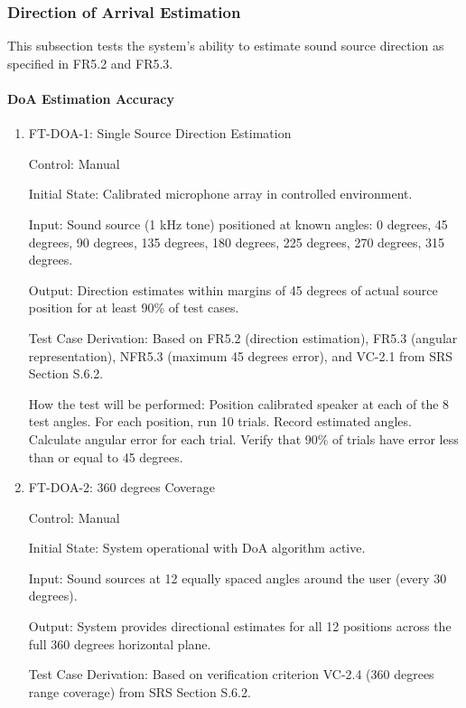 \documentclass[12pt, titlepage]{article}
\begin{document}
\subsubsection{Direction of Arrival Estimation}

This subsection tests the system's ability to estimate sound source direction as
specified in FR5.2 and FR5.3.

\paragraph{DoA Estimation Accuracy}

\begin{enumerate}

\item{FT-DOA-1: Single Source Direction Estimation\\}

Control: Manual
					
Initial State: Calibrated microphone array in controlled environment.
					
Input: Sound source (1 kHz tone) positioned at known angles: 0 degrees, 45 degrees, 90 degrees, 135 degrees,
180 degrees, 225 degrees, 270 degrees, 315 degrees.
					
Output: Direction estimates within margins of 45 degrees of actual source position for at least
90\% of test cases.

Test Case Derivation: Based on FR5.2 (direction estimation), FR5.3 (angular
representation), NFR5.3 (maximum 45 degrees error), and VC-2.1 from SRS Section S.6.2.

How the test will be performed: Position calibrated speaker at each of the 8 test
angles. For each position, run 10 trials. Record estimated angles. Calculate
angular error for each trial. Verify that 90\% of trials have error less than or
 equal to 45 degrees.

\item{FT-DOA-2: 360 degrees Coverage\\}

Control: Manual
					
Initial State: System operational with DoA algorithm active.
					
Input: Sound sources at 12 equally spaced angles around the user (every 30 degrees).
					
Output: System provides directional estimates for all 12 positions across the
full 360 degrees horizontal plane.

Test Case Derivation: Based on verification criterion VC-2.4 (360 degrees range
coverage) from SRS Section S.6.2.


\end{enumerate}
\end{document}
